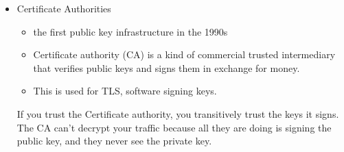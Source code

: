 \documentclass[11pt]{article} %
\begin{document}
\begin{itemize}
  \item Certificate Authorities
  \begin{itemize}\item the first public key infrastructure in the 1990s
  \item Certificate authority (CA) is  a kind of commercial trusted intermediary that verifies public keys and signs them in exchange for money. 
  \item This is used for TLS, software signing keys. 
  \end{itemize}
    If you trust the Certificate authority, you transitively trust the keys it signs. The CA can't decrypt your traffic because all they are doing is signing the public key, and they never see the private key.
\end{itemize}
\end{document}
